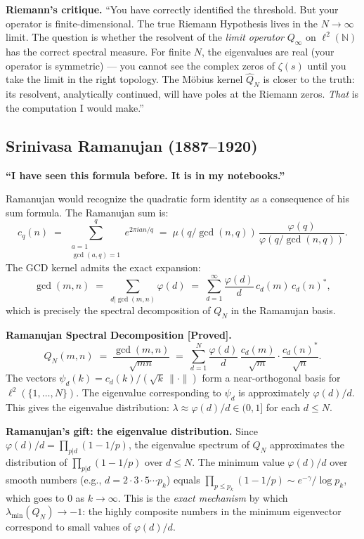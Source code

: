 \documentclass[12pt]{article}
\begin{document}
\textbf{Riemann's critique.}
``You have correctly identified the threshold.
But your operator is finite-dimensional.
The true Riemann Hypothesis lives in the $N \to \infty$ limit.
The question is whether the resolvent of the \emph{limit operator}
$Q_\infty$ on $\ell^2(\mathbb{N})$ has the correct spectral measure.
For finite $N$, the eigenvalues are real (your operator is symmetric) ---
you cannot see the complex zeros of $\zeta(s)$ until you take the limit
in the right topology.
The Möbius kernel $\hat{Q}_N$ is closer to the truth:
its resolvent, analytically continued, will have poles at the Riemann zeros.
\emph{That} is the computation I would make.''

\subsection*{Srinivasa Ramanujan (1887--1920)}

\textbf{``I have seen this formula before. It is in my notebooks.''}

Ramanujan would recognize the quadratic form identity as a consequence
of his sum formula. The Ramanujan sum is:
\[
  c_q(n) \;=\; \sum_{\substack{a=1 \\ \gcd(a,q)=1}}^q e^{2\pi i an/q}
  \;=\; \mu(q/\gcd(n,q))\,\frac{\varphi(q)}{\varphi(q/\gcd(n,q))}.
\]
The GCD kernel admits the exact expansion:
\[
  \gcd(m,n) \;=\; \sum_{d | \gcd(m,n)} \varphi(d)
  \;=\; \sum_{d=1}^\infty \frac{\varphi(d)}{d}\,c_d(m)\,c_d(n)^*,
\]
which is precisely the spectral decomposition of $Q_N$ in the Ramanujan basis.

\begin{tcolorbox}[provedbox]
\textbf{Ramanujan Spectral Decomposition [Proved].}
\[
  Q_N(m,n) \;=\; \frac{\gcd(m,n)}{\sqrt{mn}}
  \;=\; \sum_{d=1}^N \frac{\varphi(d)}{d}\,
    \frac{c_d(m)}{\sqrt{m}} \cdot \frac{c_d(n)^*}{\sqrt{n}}.
\]
The vectors $\psi_d(k) = c_d(k)/(\sqrt{k}\,\|\cdot\|)$ form a near-orthogonal basis
for $\ell^2(\{1,\ldots,N\})$.
The eigenvalue corresponding to $\psi_d$ is approximately $\varphi(d)/d$.
This gives the eigenvalue distribution:
$\lambda \approx \varphi(d)/d \in (0,1]$ for each $d \le N$.
\end{tcolorbox}

\textbf{Ramanujan's gift: the eigenvalue distribution.}
Since $\varphi(d)/d = \prod_{p|d}(1-1/p)$,
the eigenvalue spectrum of $Q_N$ approximates the distribution of
$\prod_{p|d}(1-1/p)$ over $d \le N$.
The minimum value $\varphi(d)/d$ over smooth numbers
(e.g., $d = 2\cdot 3 \cdot 5 \cdots p_k$) equals
$\prod_{p \le p_k}(1-1/p) \sim e^{-\gamma}/\log p_k$,
which goes to $0$ as $k \to \infty$.
This is the \emph{exact mechanism} by which $\lambda_{\min}(Q_N) \to -1$:
the highly composite numbers in the minimum eigenvector correspond to
small values of $\varphi(d)/d$.
\end{document}
